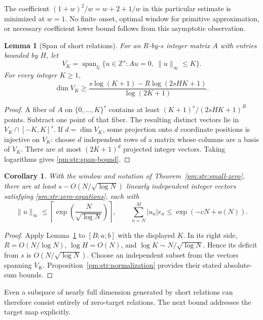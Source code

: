 \documentclass[11pt,a4paper]{article}
\newtheorem{lemma}[theorem]{Lemma}
\newtheorem{corollary}[theorem]{Corollary}
\theoremstyle{definition}
\theoremstyle{remark}
\numberwithin{equation}{section}
\begin{document}
The coefficient $(1+w)^2/w=w+2+1/w$ in this particular estimate
is minimized at $w=1$.  No finite onset, optimal window for primitive
approximation, or necessary coefficient lower bound follows from
this asymptotic observation.

\begin{lemma}[Span of short relations]\label{pm:str:short-span}
For an $R$-by-$s$ integer matrix $A$ with entries bounded by $H$, let
\[
 V_K=\operatorname{span}_{\mathbb Q}
       \{u\in\mathbb Z^s:Au=0,\ \|u\|_\infty\leq K\}.
\]
For every integer $K\geq1$,
\begin{equation}\label{pm:str:span-bound}
 \dim V_K\geq
 \frac{s\log(K+1)-R\log(2sHK+1)}{\log(2K+1)}.
\end{equation}
\end{lemma}

\begin{proof}
A fiber of $A$ on $\{0,\ldots,K\}^s$ contains at least
$(K+1)^s/(2sHK+1)^R$ points.  Subtract one point of that fiber.
The resulting distinct vectors lie in $V_K\cap[-K,K]^s$.
If $d=\dim V_K$, some projection onto $d$ coordinate positions
is injective on $V_K$: choose $d$ independent rows of a matrix whose
columns are a basis of $V_K$.  There are at most $(2K+1)^d$ projected
integer vectors.  Taking logarithms gives \eqref{pm:str:span-bound}.
\end{proof}

\begin{corollary}\label{pm:str:many-zero}
With the window and notation of Theorem~\ref{pm:str:small-zero}, there
are at least $s-O(N/\sqrt{\log N})$ linearly independent integer
vectors satisfying \eqref{pm:str:zero-equations}, each with
\[
 \|u\|_\infty\leq
   \left\lceil\exp\left(\frac{N}{\sqrt{\log N}}\right)\right\rceil,
 \qquad
 \sum_{n=N}^M|u_n|e_n\leq\exp(-cN+o(N)).
\]
\end{corollary}

\begin{proof}
Apply Lemma~\ref{pm:str:short-span} to $[B;a;b]$ with the displayed
$K$.  In its right side, $R=O(N/\log N)$, $\log H=O(N)$, and
$\log K\sim N/\sqrt{\log N}$.  Hence its deficit from $s$ is
$O(N/\sqrt{\log N})$.  Choose an independent subset from the
vectors spanning $V_K$.  Proposition~\ref{pm:str:normalization}
provides their stated absolute-sum bounds.
\end{proof}

Even a subspace of nearly full dimension generated by short relations
can therefore consist entirely of zero-target relations.  The next
bound addresses the target map explicitly.
\end{document}

